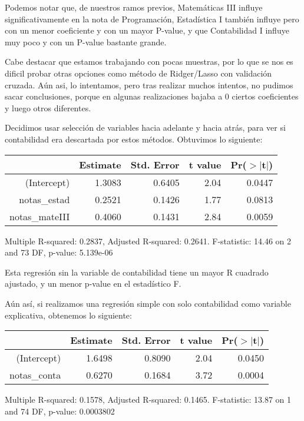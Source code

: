 \documentclass[11pt]{article}
\begin{document}
Podemos notar que, de nuestros ramos previos, Matemáticas III influye significativamente en la nota de Programación, Estadística I también influye pero con un menor coeficiente y con un mayor P-value, y que Contabilidad I influye muy poco y con un P-value bastante grande.

Cabe destacar que estamos trabajando con pocas muestras, por lo que se nos es dificil probar otras opciones como método de Ridger/Lasso con validación cruzada. Aún asi, lo intentamos, pero tras realizar muchos intentos, no pudimos sacar conclusiones, porque en algunas realizaciones bajaba a 0 ciertos coeficientes y luego otros diferentes.

Decidimos usar selección de variables hacia adelante y hacia atrás, para ver si contabilidad era descartada por estos métodos. Obtuvimos lo siguiente:

\begin{center}
\begin{table}[ht]
\begin{center}
\begin{tabular}{rrrrr}
  \hline
 & Estimate & Std. Error & t value & Pr($>$$|$t$|$) \\ 
  \hline
(Intercept) & 1.3083 & 0.6405 & 2.04 & 0.0447 \\ 
  notas\_estad & 0.2521 & 0.1426 & 1.77 & 0.0813 \\ 
  notas\_mateIII & 0.4060 & 0.1431 & 2.84 & 0.0059 \\ 
   \hline
\end{tabular}
\end{center}
\end{table}

\tiny{Multiple R-squared: 0.2837, Adjusted R-squared: 0.2641.
F-statistic: 14.46 on 2 and 73 DF, p-value: 5.139e-06}
\end{center}

Esta regresión sin la variable de contabilidad tiene un mayor R cuadrado ajustado, y un menor p-value en el estadístico F.

Aún así, si realizamos una regresión simple con solo contabilidad como variable explicativa, obtenemos lo siguiente:

\begin{center}
\begin{table}[ht]
\centering
\begin{tabular}{rrrrr}
  \hline
 & Estimate & Std. Error & t value & Pr($>$$|$t$|$) \\ 
  \hline
(Intercept) & 1.6498 & 0.8090 & 2.04 & 0.0450 \\ 
  notas\_conta & 0.6270 & 0.1684 & 3.72 & 0.0004 \\ 
   \hline
\end{tabular}
\end{table}

\tiny{Multiple R-squared: 0.1578, Adjusted R-squared: 0.1465.
F-statistic: 13.87 on 1 and 74 DF, p-value: 0.0003802}
\end{center}
\end{document}
